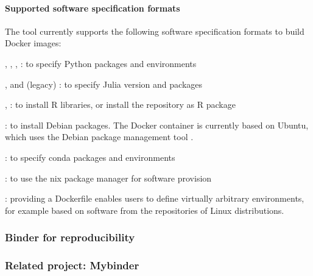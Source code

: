 \paragraph{Supported software specification formats}
\label{repo2docker-supported-software-specifications}
The \repotodocker{} tool currently supports the following software specification
formats to build Docker images:
\begin{compactitem}
\item {}, ,
  , : to specify Python
  packages and environments
\item {},  and (legacy)
  : to
  specify Julia version and packages
\item {}, : to install R
  libraries, or install the repository as R package
\item {}: to install Debian packages. The Docker container
  is currently based on Ubuntu, which uses the Debian package management tool .
\item {}: to specify conda packages and
  environments
\item {}: to use the nix package manager for software provision
\item {}: providing a Dockerfile enables users to define
  virtually arbitrary environments, for example based on software from the
  repositories of Linux distributions.
\end{compactitem}

\medskip
\subsubsection{Binder for reproducibility}\label{sec:binder-for-reproducibility}
\TOWRITE{}{}


\subsubsection{Related project: Mybinder}\label{sec:mybinder}



